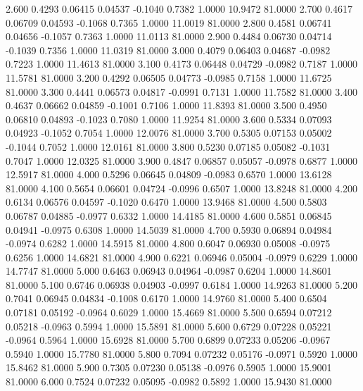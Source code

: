    2.600   0.4293   0.06415   0.04537  -0.1040   0.7382   1.0000  10.9472  81.0000
   2.700   0.4617   0.06709   0.04593  -0.1068   0.7365   1.0000  11.0019  81.0000
   2.800   0.4581   0.06741   0.04656  -0.1057   0.7363   1.0000  11.0113  81.0000
   2.900   0.4484   0.06730   0.04714  -0.1039   0.7356   1.0000  11.0319  81.0000
   3.000   0.4079   0.06403   0.04687  -0.0982   0.7223   1.0000  11.4613  81.0000
   3.100   0.4173   0.06448   0.04729  -0.0982   0.7187   1.0000  11.5781  81.0000
   3.200   0.4292   0.06505   0.04773  -0.0985   0.7158   1.0000  11.6725  81.0000
   3.300   0.4441   0.06573   0.04817  -0.0991   0.7131   1.0000  11.7582  81.0000
   3.400   0.4637   0.06662   0.04859  -0.1001   0.7106   1.0000  11.8393  81.0000
   3.500   0.4950   0.06810   0.04893  -0.1023   0.7080   1.0000  11.9254  81.0000
   3.600   0.5334   0.07093   0.04923  -0.1052   0.7054   1.0000  12.0076  81.0000
   3.700   0.5305   0.07153   0.05002  -0.1044   0.7052   1.0000  12.0161  81.0000
   3.800   0.5230   0.07185   0.05082  -0.1031   0.7047   1.0000  12.0325  81.0000
   3.900   0.4847   0.06857   0.05057  -0.0978   0.6877   1.0000  12.5917  81.0000
   4.000   0.5296   0.06645   0.04809  -0.0983   0.6570   1.0000  13.6128  81.0000
   4.100   0.5654   0.06601   0.04724  -0.0996   0.6507   1.0000  13.8248  81.0000
   4.200   0.6134   0.06576   0.04597  -0.1020   0.6470   1.0000  13.9468  81.0000
   4.500   0.5803   0.06787   0.04885  -0.0977   0.6332   1.0000  14.4185  81.0000
   4.600   0.5851   0.06845   0.04941  -0.0975   0.6308   1.0000  14.5039  81.0000
   4.700   0.5930   0.06894   0.04984  -0.0974   0.6282   1.0000  14.5915  81.0000
   4.800   0.6047   0.06930   0.05008  -0.0975   0.6256   1.0000  14.6821  81.0000
   4.900   0.6221   0.06946   0.05004  -0.0979   0.6229   1.0000  14.7747  81.0000
   5.000   0.6463   0.06943   0.04964  -0.0987   0.6204   1.0000  14.8601  81.0000
   5.100   0.6746   0.06938   0.04903  -0.0997   0.6184   1.0000  14.9263  81.0000
   5.200   0.7041   0.06945   0.04834  -0.1008   0.6170   1.0000  14.9760  81.0000
   5.400   0.6504   0.07181   0.05192  -0.0964   0.6029   1.0000  15.4669  81.0000
   5.500   0.6594   0.07212   0.05218  -0.0963   0.5994   1.0000  15.5891  81.0000
   5.600   0.6729   0.07228   0.05221  -0.0964   0.5964   1.0000  15.6928  81.0000
   5.700   0.6899   0.07233   0.05206  -0.0967   0.5940   1.0000  15.7780  81.0000
   5.800   0.7094   0.07232   0.05176  -0.0971   0.5920   1.0000  15.8462  81.0000
   5.900   0.7305   0.07230   0.05138  -0.0976   0.5905   1.0000  15.9001  81.0000
   6.000   0.7524   0.07232   0.05095  -0.0982   0.5892   1.0000  15.9430  81.0000
